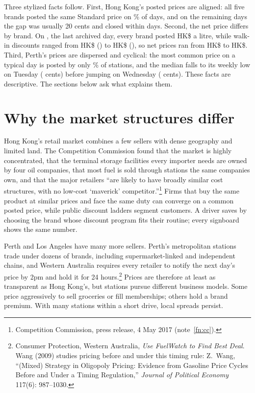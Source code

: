 \documentclass[11pt]{article}
\newcommand{\hk}{HK\$}
\begin{document}
Three stylized facts follow. First, Hong Kong's posted prices are aligned: all five brands posted the same Standard price on \hkShareEqual\% of days, and on the remaining days the gap was usually 20 cents and closed within days. Second, the net price differs by brand. On \essayDiscDate, the last archived day, every brand posted \hk\essayPump{} a litre, while walk-in discounts ranged from \hk\essayDiscLow{} (\essayDiscLowBrand) to \hk\essayDiscHigh{} (\essayDiscHighBrand), so net prices ran from \hk\essayNetLow{} to \hk\essayNetHigh. Third, Perth's prices are dispersed and cyclical: the most common price on a typical day is posted by only \perthModal\% of stations, and the median falls to its weekly low on Tuesday (\perthTue{} cents) before jumping on Wednesday (\perthWed{} cents). These facts are descriptive. The sections below ask what explains them.

\section{Why the market structures differ}

Hong Kong's retail market combines a few sellers with dense geography and limited land. The Competition Commission found that the market is highly concentrated, that the terminal storage facilities every importer needs are owned by four oil companies, that most fuel is sold through stations the same companies own, and that the major retailers ``are likely to have broadly similar cost structures, with no low-cost `maverick' competitor.''\footnote{Competition Commission, press release, 4 May 2017 (note~\ref{fn:cc}).} Firms that buy the same product at similar prices and face the same duty can converge on a common posted price, while public discount ladders segment customers. A driver saves by choosing the brand whose discount program fits their routine; every signboard shows the same number.

Perth and Los Angeles have many more sellers. Perth's \perthStations{} metropolitan stations trade under dozens of brands, including supermarket-linked and independent chains, and Western Australia requires every retailer to notify the next day's price by 2pm and hold it for 24 hours.\footnote{Consumer Protection, Western Australia, \emph{Use FuelWatch to Find Best Deal}. Wang (2009) studies pricing before and under this timing rule: Z.~Wang, ``(Mixed) Strategy in Oligopoly Pricing: Evidence from Gasoline Price Cycles Before and Under a Timing Regulation,'' \emph{Journal of Political Economy} 117(6): 987--1030.} Prices are therefore at least as transparent as Hong Kong's, but stations pursue different business models. Some price aggressively to sell groceries or fill memberships; others hold a brand premium. With many stations within a short drive, local spreads persist.
\end{document}
